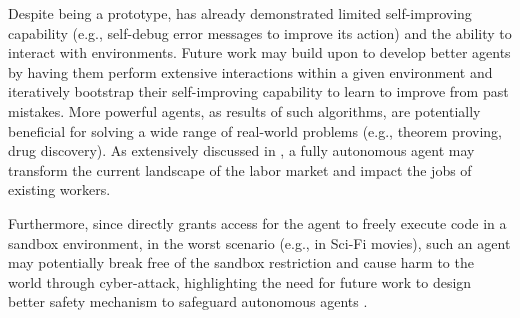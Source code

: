 Despite being a prototype, \modelname has already demonstrated limited self-improving capability (e.g., self-debug error messages to improve its action) and the ability to interact with environments.
% 
Future work may build upon \modelname to develop better agents by having them perform extensive interactions within a given environment and iteratively bootstrap their self-improving capability to learn to improve from past mistakes.
% 
More powerful agents, as results of such algorithms, are potentially beneficial for solving a wide range of real-world problems  (e.g., theorem proving, drug discovery).
% 
As extensively discussed in \cite{eloundou2023gpts}, a fully autonomous agent may transform the current landscape of the labor market and impact the jobs of existing workers.

% 
Furthermore, since \approach directly grants access for the agent to freely execute code in a sandbox environment, in the worst scenario (e.g., in Sci-Fi movies), such an agent may potentially break free of the sandbox restriction and cause harm to the world through cyber-attack, highlighting the need for future work to design better safety mechanism to safeguard autonomous agents \citep{tang2024prioritizing}.
